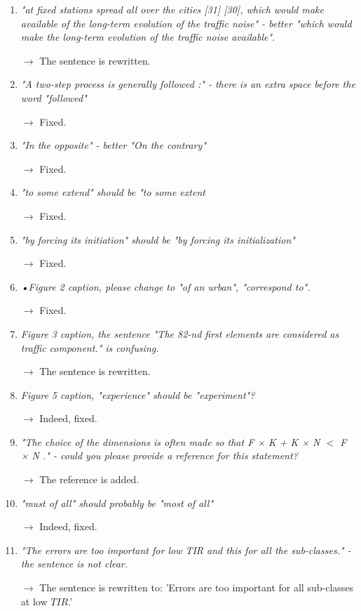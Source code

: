 \documentclass[10pt]{article}
\begin{document}
\begin{enumerate}
\item \emph{"at fixed stations spread all over the cities [31] [30], which would make available of the long-term evolution of the traffic noise" - better "which would make the long-term evolution of the traffic noise available".}

$\rightarrow$ The sentence is rewritten.

\item \emph{"A two-step process is generally followed :" - there is an extra space before the word "followed" }

$\rightarrow$ Fixed.

\item \emph{"In the opposite" - better "On the contrary"}

$\rightarrow$ Fixed.

\item \emph{"to some extend" should be "to some extent}

$\rightarrow$ Fixed.

\item \emph{"by forcing its initiation" should be "by forcing its initialization"}

$\rightarrow$ Fixed.

\item \emph{•Figure 2 caption, please change to "of an urban", "correspond to".}

$\rightarrow$ Fixed.

\item \emph{Figure 3 caption, the sentence "The 82-nd first elements are considered as traffic component." is confusing.}

$\rightarrow$ The sentence is rewritten.

\item \emph{Figure 5 caption, "experience" should be "experiment"?}

$\rightarrow$ Indeed, fixed.

\item \emph{"The choice of the dimensions is often made so that F × K + K × N $<$ F × N ." - could you please provide a reference for this statement? }

$\rightarrow$ The reference \cite{fevotte_nonnegative_2009} is added.

\item \emph{"must of all" should probably be "most of all" }

$\rightarrow$ Indeed, fixed.

\item \emph{"The errors are too important for low TIR and this for all the sub-classes." - the sentence is not clear.}

$\rightarrow$ The sentence is rewritten to: 'Errors are too important for all sub-classes at low $TIR$.'

\end{enumerate}


\end{document}
